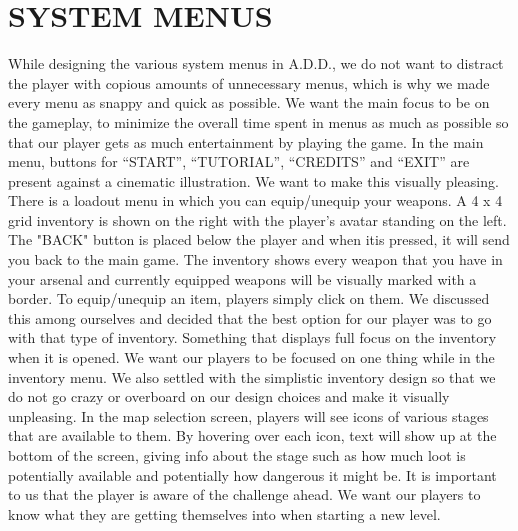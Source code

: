 \documentclass{article}
\begin{document}
\section{SYSTEM MENUS \label{menus}}
While designing the various system menus in A.D.D., we do not want to distract the player with copious amounts of unnecessary menus, which is why we made every menu as snappy and quick as possible. We want the main focus to be on the gameplay, to minimize the overall time spent in menus as much as possible so that our player gets as much entertainment by playing the game.
\bigbreak
In the main menu, buttons for “START”, “TUTORIAL”, “CREDITS” and “EXIT” are present against a cinematic illustration. We want to make this visually pleasing. 
\bigbreak
There is a loadout menu in which you can equip/unequip your weapons. A 4 x 4 grid inventory is shown on the right with the player's avatar standing on the left. The "BACK" button is placed below the player and when itis pressed, it will send you back to the main game. The inventory shows every weapon that you have in your arsenal and currently equipped weapons will be visually marked with a border. To equip/unequip an item, players simply click on them.
\bigbreak
We discussed this among ourselves and decided that the best option for our player was to go with that type of inventory. Something that displays full focus on the inventory when it is opened. We want our players to be focused on one thing while in the inventory menu. We also settled with the simplistic inventory design so that we do not go crazy or overboard on our design choices and make it visually unpleasing.
\bigbreak
In the map selection screen, players will see icons of various stages that are available to them. By hovering over each icon, text will show up at the bottom of the screen, giving info about the stage such as how much loot is potentially available and potentially how dangerous it might be. It is important to us that the player is aware of the challenge ahead. We want our players to know what they are getting themselves into when starting a new level.
\end{document}
